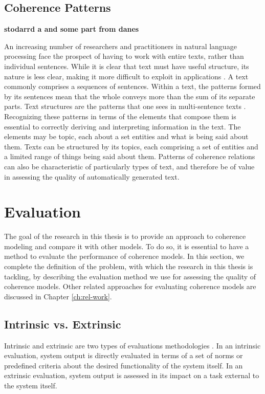 \subsection{Coherence Patterns}
\textbf{stodarrd a and some part from danes}

An increasing number of researchers and practitioners in natural language processing face the prospect of having to work with entire texts, rather than individual sentences. 
While it is clear that text must have useful structure, its nature is less clear, making it more difficult to exploit in applications \cite{webber12a}. 
A text commonly comprises a sequences of sentences. 
Within a text, the patterns formed by its sentences mean that the whole conveys more than the sum of its separate parts. 
Text structures are the patterns that one sees in multi-sentence texts \cite{webber12a}. 
Recognizing these patterns in terms of the elements that compose them is essential to correctly deriving and interpreting information in the text. 
The elements may be topic, each  about a set entities and what is being said about them.
Texts can be structured by its topics, each comprising a set of entities and a limited range of things being said about them. 
Patterns of coherence relations can also be characteristic of particularly types of text, and therefore be of value in assessing the quality of automatically generated text. 

\section{Evaluation}
\label{sec:coh-eval}

The goal of the research in this thesis is to provide an approach to coherence modeling and compare it with other models. 
To do so, it is essential to have a method to evaluate the performance of coherence models. 
In this section, we complete the definition of the problem, with which the research in this thesis is tackling, by describing the evaluation method we use for assessing the quality of coherence models. 
Other related approaches for evaluating coherence models are discussed in Chapter \ref{ch:rel-work}. 

\subsection{Intrinsic vs. Extrinsic}

Intrinsic and extrinsic are two types of evaluations methodologies \cite{}. 
In an intrinsic evaluation, system output is directly evaluated in terms of a set of norms or predefined criteria about the desired functionality of the system itself. 
In an extrinsic evaluation, system output is assessed in its impact on a task external to the system itself. 

